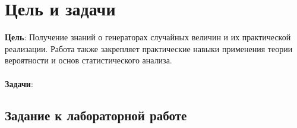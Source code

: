 \chapter*{Цель и задачи}
\label{ch:intro}

\textbf{Цель}: Получение знаний о генераторах случайных величин и
их практической реализации. Работа также закрепляет практические навыки
применения теории вероятности и основ статистического анализа. \\
\\\textbf{Задачи}:

\section*{Задание к лабораторной работе}

